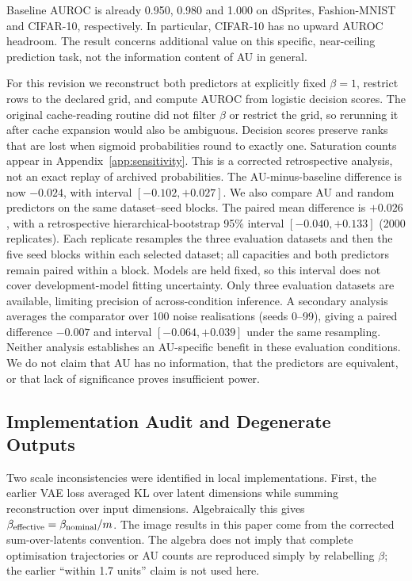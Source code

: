 \documentclass[make,article,submit,pdftex,moreauthors]{Definitions/mdpi}
\begin{document}
Baseline AUROC is already 0.950, 0.980 and 1.000 on dSprites,
Fashion-MNIST and CIFAR-10, respectively. In particular, CIFAR-10 has
no upward AUROC headroom. The result concerns additional value on this
specific, near-ceiling prediction task, not the information content of
AU in general.

For this revision we reconstruct both predictors at explicitly fixed
$\beta=1$, restrict rows to the declared grid, and compute AUROC from
logistic decision scores. The original cache-reading routine did not
filter $\beta$ or restrict the grid, so rerunning it after cache expansion
would also be ambiguous. Decision scores preserve ranks that are lost
when sigmoid probabilities round to exactly one. Saturation counts
appear in Appendix~\ref{app:sensitivity}. This is a corrected retrospective
analysis, not an exact replay of archived probabilities. The
AU-minus-baseline difference is now $-0.024$, with interval
$[-0.102,+0.027]$. We also compare AU and random
predictors on the same dataset--seed blocks.
The paired mean difference is $+0.026$, with a retrospective
hierarchical-bootstrap 95\% interval $[-0.040,+0.133]$ (2000
replicates). Each replicate resamples the three evaluation datasets and
then the five seed blocks within each selected dataset; all capacities
and both predictors remain paired within a block. Models are held fixed,
so this interval does not cover development-model fitting uncertainty.
Only three evaluation datasets are available, limiting precision of
across-condition inference. A secondary analysis averages the comparator
over 100 noise realisations (seeds 0--99), giving a paired difference
$-0.007$ and interval $[-0.064,+0.039]$ under the
same resampling. Neither analysis establishes an AU-specific benefit in
these evaluation conditions. We do not claim that AU has no information,
that the predictors are equivalent, or that lack of significance proves
insufficient power.

\subsection{Implementation Audit and Degenerate Outputs}
Two scale inconsistencies were identified in local implementations.
First, the earlier VAE loss averaged KL over latent dimensions while
summing reconstruction over input dimensions. Algebraically this gives
$\beta_{\rm effective}=\beta_{\rm nominal}/m$. The image results in
this paper come from the corrected sum-over-latents convention. The
algebra does not imply that complete optimisation trajectories or AU
counts are reproduced simply by relabelling $\beta$; the earlier
``within 1.7 units'' claim is not used here.
\end{document}
